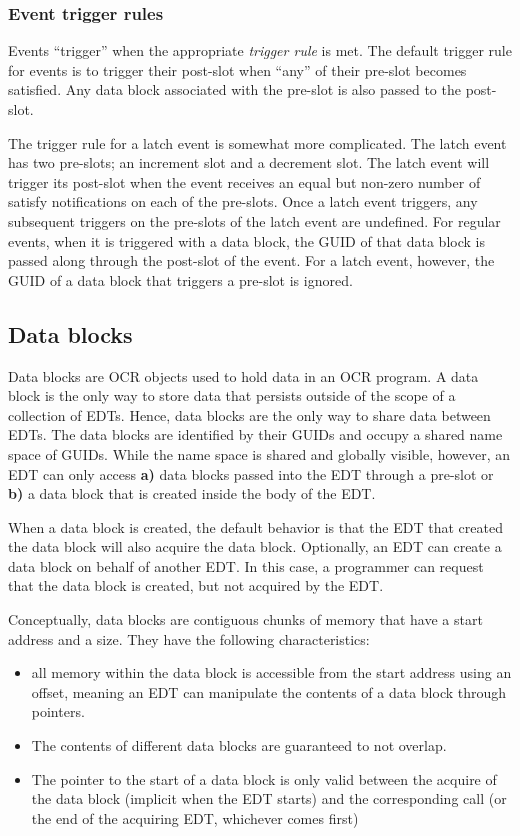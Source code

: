 \subsubsection{Event trigger rules}
Events ``trigger'' when the appropriate \emph{trigger
rule} is met. The default trigger rule for events
is to trigger their post-slot when ``any'' of their pre-slot becomes
satisfied. Any data block associated with the pre-slot is also passed
to the post-slot.

The trigger rule for a latch event is somewhat more complicated. The
latch event has two pre-slots; an increment slot and a decrement
slot. The latch event will trigger its post-slot when the event
receives an equal but non-zero number of satisfy notifications on each
of the pre-slots. Once a latch event triggers, any subsequent
triggers on the pre-slots of the latch event are undefined. For
regular events, when it is triggered with a data block, the GUID of
that data block is passed along through the post-slot of the
event. For a latch event, however, the GUID of a data block that
triggers a pre-slot is ignored.

\subsection{Data blocks}
\label{sec:datablocks}
Data blocks are OCR objects used to hold data in an OCR program. A
data block is the only way to store data that persists outside of the
scope of a collection of EDTs. Hence, data blocks are the only way to
share data between EDTs. The data blocks are identified by their
GUIDs and occupy a shared name space of GUIDs. While the name space
is shared and globally visible, however, an EDT can only access {\bf a)}
data blocks passed into the EDT through a pre-slot or {\bf b)} a data block
that is created inside the body of the EDT.

When a data block is created, the default behavior is that the EDT
that created the data block will also acquire the data block.
Optionally, an EDT can
create a data block on behalf of another EDT. In this case, a
programmer can request that the data block is created, but not
acquired by the EDT.

Conceptually, data blocks are contiguous chunks of memory
that have a start address and a size. They have the following characteristics:
\begin{itemize}
\item all memory within the data block is accessible from the
start address using an offset, meaning an EDT can manipulate the
contents of a data block through pointers.
\item The contents of different data blocks are guaranteed to not
overlap.
\item The pointer to the start of a data block is only valid between
the acquire of the data block (implicit when the EDT starts) and the
corresponding  call (or the end of the acquiring
EDT, whichever comes first)
\end{itemize}

